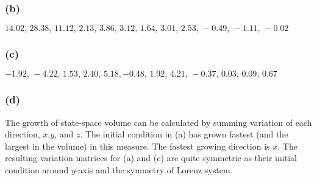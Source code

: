\documentclass{article}
\begin{document}
\subsubsection*{(b)}
$14.02,\, 28.38, \, 11.12,\, 2.13,\, 3.86,\, 3.12,\, 1.64,\, 3.01,\, 2.53,\, -0.49,\, -1.11,\, -0.02$

\subsubsection*{(c)}
$-1.92,\, -4.22,\, 1.53,\, 2.40,\, 5.18, -0.48,\, 1.92,\, 4.21,\, -0.37,\, 0.03,\, 0.09,\, 0.67$
\subsubsection*{(d)}
The growth of state-space volume can be calculated by summing variation of each direction, $x$,$y$, and $z$. The initial condition in (a) has grown fastest (and the largest in the volume) in this measure. The fastest growing direction is $x$. The resulting variation matrices for (a) and (c) are quite symmetric as their initial condition around $y$-axis and the symmetry of Lorenz system. 
\end{document}
